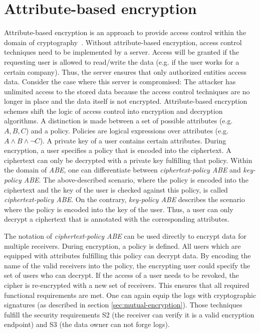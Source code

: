 \documentclass[../main.tex]{subfiles}
\begin{document}
\section{Attribute-based encryption}
\label{sec:attribute-encryption}
Attribute-based encryption is an approach to provide access control within the domain of cryptography~\cite{Bethencourt2007}. 
Without attribute-based encryption, access control techniques need to be implemented by a server. 
Access will be granted if the requesting user is allowed to read/write the data (e.g. if the user works for a certain company). 
Thus, the server ensures that only authorized entities access data. 
Consider the case where this server is compromised: 
The attacker has unlimited access to the stored data because the access control techniques are no longer in place and the data itself is not encrypted.
Attribute-based encryption schemes shift the logic of access control into encryption and decryption algorithms. 
A distinction is made between a set of possible attributes (e.g. ${A,B,C}$) and a policy. 
Policies are logical expressions over attributes (e.g. $A \land B \land \neg C$). 
A private key of a user contains certain attributes. 
During encryption, a user specifies a policy that is encoded into the ciphertext.
A ciphertext can only be decrypted with a private key fulfilling that policy.
Within the domain of \textit{ABE}, one can differentiate between \textit{ciphertext-policy ABE} and \textit{key-policy ABE}. 
The above-described scenario, where the policy is encoded into the ciphertext and the key of the user is checked against this policy, is called \textit{ciphertext-policy ABE}. 
On the contrary, \textit{key-policy ABE} describes the scenario where the policy is encoded into the key of the user.
Thus, a user can only decrypt a ciphertext that is annotated with the corresponding attributes.~\cite{Bethencourt2007}

The notation of \textit{ciphertext-policy ABE} can be used directly to encrypt data for multiple receivers. 
During encryption, a policy is defined. 
All users which are equipped with attributes fulfilling this policy can decrypt data.
By encoding the name of the valid receivers into the policy, the encrypting user could specify the set of users who can decrypt.
If the access of a user needs to be revoked, the cipher is re-encrypted with a new set of receivers.
This ensures that all required functional requirements are met.
One can again equip the logs with cryptographic signatures (as described in section \ref{sec:mutual-encryption}).
Those techniques fulfill the security requirements S2 (the receiver can verify it is a valid encryption endpoint) and S3 (the data owner can not forge logs).
\end{document}

